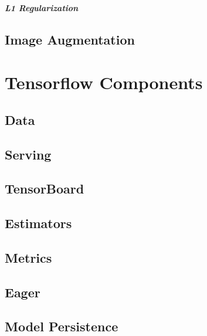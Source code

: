 \paragraph{L1 Regularization}

\section{Image Augmentation}

\chapter{Tensorflow Components}

\section{Data}

\section{Serving}

\section{TensorBoard}

\section{Estimators}

\section{Metrics}

\section{Eager}

\section{Model Persistence}

